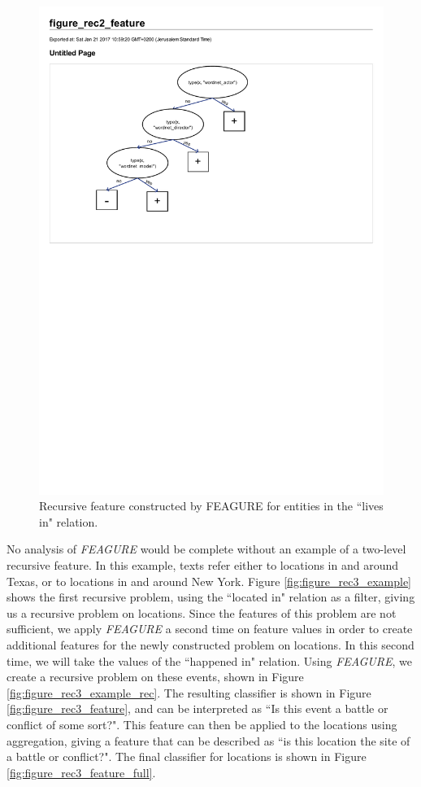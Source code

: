 \documentclass[twoside,11pt]{article}
\theoremstyle{definition}
\begin{document}
\begin{figure}[h!]
	\centering
	\includegraphics[width=0.7\linewidth]{figure_rec2_feature}
	\caption{Recursive feature constructed by FEAGURE for entities in the ``lives in" relation.}
	\label{fig:figure_rec2_feature}
\end{figure}

No analysis of \emph{FEAGURE} would be complete without an example of a two-level recursive feature. In this example, texts refer either to locations in and around Texas, or to locations in and around New York. Figure \ref{fig:figure_rec3_example} shows the first recursive problem, using the ``located in" relation as a filter, giving us a recursive problem on locations. Since the features of this problem are not sufficient, we apply \emph{FEAGURE} a second time on feature values in order to create additional features for the newly constructed problem on locations. In this second time, we will take the values of the ``happened in" relation. Using \emph{FEAGURE}, we create a recursive problem on these events, shown in Figure \ref{fig:figure_rec3_example_rec}. The resulting classifier is shown in Figure \ref{fig:figure_rec3_feature}, and can be interpreted as ``Is this event a battle or conflict of some sort?".
This feature can then be applied to the locations using aggregation, giving a feature that can be described as ``is this location the site of a battle or conflict?". The final classifier for locations is shown in Figure \ref{fig:figure_rec3_feature_full}.
 
\end{document}
